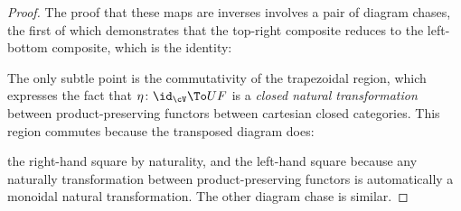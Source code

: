 \begin{proof}
The proof that these maps are inverses involves a pair of diagram chases, the first of which demonstrates that the top-right composite reduces to the left-bottom composite, which is the identity:
\begin{center}
\end{center}
The only subtle point is the commutativity of the trapezoidal region, which expresses the fact that $\eta \colon \id_\cV \To UF$ is a \emph{closed natural transformation} between product-preserving functors between cartesian closed categories. This region commutes because the transposed diagram does:
\begin{center}
\end{center}
the right-hand square by naturality, and the left-hand square because any naturally transformation between product-preserving functors is automatically a monoidal natural transformation. %
  The other diagram chase is similar.
\end{proof}

